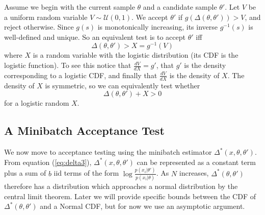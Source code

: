 \documentclass{article}
\begin{document}
Assume we begin with the current sample $\theta$  and a
candidate sample $\theta'$. Let $V$ be a uniform random variable $V \sim
\mathcal{U}(0,1)$. We accept $\theta'$ if $g(\Delta(\theta,\theta')) > V$, and reject otherwise.
Since $g(s)$ is monotonically increasing, its inverse $g^{-1}(s)$ is well-defined and
unique. So an equivalent test is to accept $\theta'$ iff
\begin{equation}
  \Delta(\theta,\theta') > X = g^{-1}(V)
\end{equation}
where $X$ is a random variable with the logistic distribution (its CDF is the logistic function). To
see this notice that $\frac{dV}{dX} = g'$, that $g'$ is the density corresponding to a logistic
CDF, and finally that $\frac{dV}{dX}$ is the density of $X$. The density of $X$ is symmetric,
so we can equivalently test whether
\begin{equation}
  \label{theexacttest}
  \Delta(\theta,\theta') + X > 0
\end{equation}
for a logistic random $X$. 


\subsection{A Minibatch Acceptance Test}\label{ssec:deltas_minibatch}

We now move to acceptance testing using the minibatch estimator
$\Delta^*(x,\theta,\theta')$. From equation (\ref{eq:delta3}),
$\Delta^*(x,\theta,\theta')$ can be represented as a constant term
plus a sum of $b$ iid terms of the form
$\log\frac{p(x_i|\theta')}{p(x_i|\theta)}$. As $N$ increases, $\Delta^*(\theta,\theta')$
therefore has a distribution which approaches a normal distribution by the central limit
theorem. Later we will provide specific bounds between the CDF of $\Delta^*(\theta,\theta')$
and a Normal CDF, but for now we use an asymptotic argument. 
\end{document}
